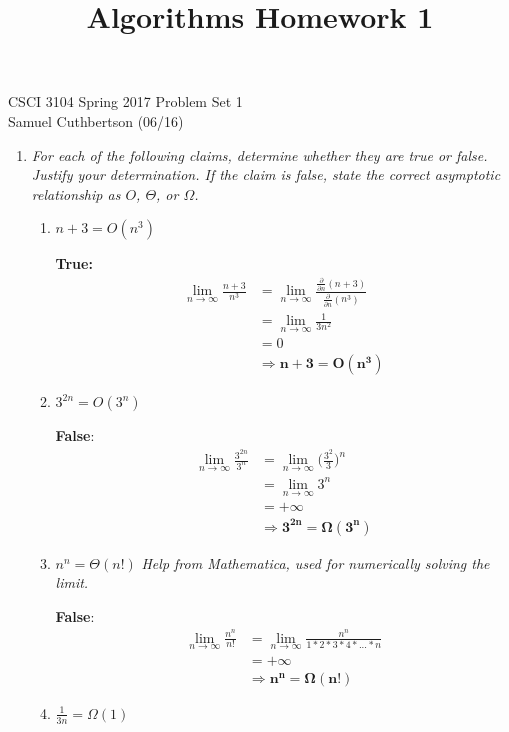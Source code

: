 \documentclass[12pt]{article}
\begin{document}
\title{Algorithms Homework 1}

CSCI 3104 Spring 2017 \hfill Problem Set 1\\
Samuel Cuthbertson (06/16) 

\hrulefill

\begin{enumerate}

	\item \textit{For each of the following claims, determine whether they are true or false. Justify your determination. If the claim is false, state the correct asymptotic relationship as $O$, $\Theta$, or $\Omega$.}
    \begin{enumerate}
	\item \textit{$n + 3 = O(n^3)$}
    
	\textbf{True:}
    \begin{align*}
    \lim_{n\to\infty} \frac{n+3}{n^3} &= \lim_{n\to\infty} \frac{\frac{\partial}{\partial n}(n+3)}{\frac{\partial}{\partial n}(n^3)} \\
    &= \lim_{n\to\infty} \frac{1}{3n^2} \\
    &= 0 \\
    &\Rightarrow \mathbf{n+3 = O(n^3)}
    \end{align*}
	
	\item \textit{$3^{2n} = O(3^n)$}
	
    \textbf{False}: 
    \begin{align*}
    \lim_{n\to\infty} \frac{3^{2n}}{3^n} &= \lim_{n\to\infty} \bigg(\frac{3^2}{3}\bigg)^n \\
    &= \lim_{n\to\infty} 3^n \\
    &= +\infty \\
    &\Rightarrow \mathbf{3^{2n} = \Omega(3^n)}
    \end{align*}
    
    \item \textit{$n^{n} = \Theta(n!)$} \textit{Help from Mathematica, used for numerically solving the limit.}
	
    \textbf{False}: 
    \begin{align*}
    \lim_{n\to\infty} \frac{n^n}{n!} &= \lim_{n\to\infty} \frac{n^n}{1*2*3*4*...*n} \\
    &= +\infty \\
    &\Rightarrow \mathbf{n^{n} = \Omega(n!)}
    \end{align*}
    
    \item \textit{$\frac{1}{3n} = \Omega(1)$}
	

\end{enumerate}
\end{enumerate}
\end{document}
